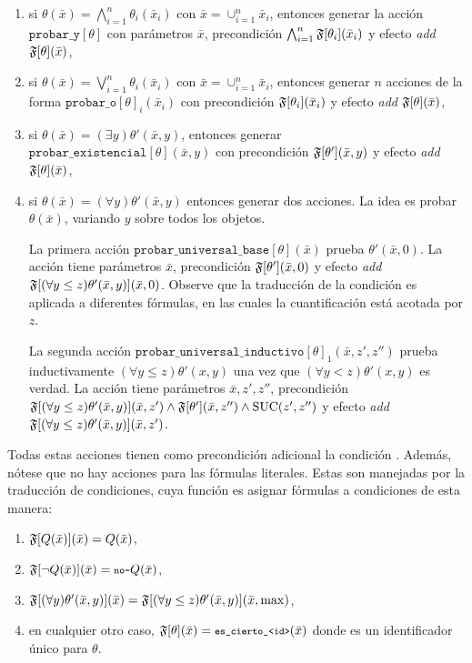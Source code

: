 \begin{enumerate}[--]
\item si $\theta(\bar x)=\bigwedge_{i=1}^n \theta_i(\bar x_i)$
  con $\bar x=\cup_{i=1}^n \bar x_i$, entonces generar la acción
  $\texttt{probar\_y}[\theta]$ con parámetros $\bar x$, precondición
  $\bigwedge_{i=1}^n \mathfrak{F}[\theta_i](\bar x_i)$ y efecto \textit{add}
  $\mathfrak{F}[\theta](\bar x)$,
%
\item si $\theta(\bar x)=\bigvee_{i=1}^n \theta_i(\bar x_i)$ con
  $\bar x=\cup_{i=1}^n \bar x_i$, entonces generar $n$ acciones de la forma
  $\texttt{probar\_o}[\theta]_i(\bar x_i)$ con precondición
  $\mathfrak{F}[\theta_i](\bar x_i)$ y efecto \textit{add} $\mathfrak{F}[\theta](\bar x)$,
%
\item si $\theta(\bar x)=(\exists y)\theta'(\bar x,y)$, entonces generar
  $\texttt{probar\_existencial}[\theta](\bar x,y)$ con precondición $\mathfrak{F}[\theta'](\bar x,y)$
  y efecto \textit{add} $\mathfrak{F}[\theta](\bar x)$,
%
\item si $\theta(\bar x)=(\forall y)\theta'(\bar x,y)$ entonces generar
  dos acciones. La idea es probar $\theta(\bar x)$, variando $y$
  sobre todos los objetos.

  La primera acción $\texttt{probar\_universal\_base}[\theta](\bar x)$ prueba $\theta'(\bar x,0)$.
  La acción tiene parámetros $\bar x$, precondición $\mathfrak{F}[\theta'](\bar x,0)$
  y efecto \textit{add} $\mathfrak{F}[(\forall y\leq z)\theta'(\bar x,y)](\bar x,0)$.
  Observe que la traducción de la condición es aplicada a diferentes
fórmulas,
  en las cuales la cuantificación está acotada por $z$.

  La segunda acción $\texttt{probar\_universal\_inductivo}[\theta]_1(\bar x,z',z'')$ prueba inductivamente
  $(\forall y\leq z)\theta'(x,y)$ una vez que $(\forall y<z)\theta'(x,y)$ es
verdad.
  La acción tiene parámetros $\bar x,z',z''$, precondición
  $\mathfrak{F}[(\forall y\leq z)\theta'(\bar x, y)](\bar x,z')\land\mathfrak{F}[\theta'](\bar x,z'')\land \text{SUC}(z',z'')$
  y efecto \textit{add} $\mathfrak{F}[(\forall y\leq z)\theta'(\bar x,y)](\bar x,z')$.
\end{enumerate}
Todas estas acciones tienen como precondición adicional la condición
. Además, nótese que no hay acciones para las fórmulas literales.
Estas son manejadas por la traducción de condiciones, cuya función es asignar
fórmulas a condiciones de esta manera:
\begin{enumerate}[--]
\item $\mathfrak{F}[Q(\bar x)](\bar x)=Q(\bar x)$,
\item $\mathfrak{F}[\neg Q(\bar x)](\bar x)={\texttt{\footnotesize no-}}Q(\bar x)$,
\item $\mathfrak{F}[(\forall y)\theta'(\bar x,y)](\bar x) =
  \mathfrak{F}[(\forall y\leq z)\theta'(\bar x,y)](\bar x,\max)$,
\item en cualquier otro caso, $\mathfrak{F}[\theta](\bar x)={\texttt{\footnotesize es\_cierto\_<id>}}(\bar x)$
  donde  es un identificador único para $\theta$.
\end{enumerate}

